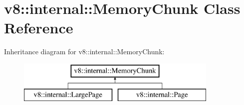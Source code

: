 \hypertarget{classv8_1_1internal_1_1_memory_chunk}{}\section{v8\+:\+:internal\+:\+:Memory\+Chunk Class Reference}
\label{classv8_1_1internal_1_1_memory_chunk}
Inheritance diagram for v8\+:\+:internal\+:\+:Memory\+Chunk\+:\begin{figure}[H]
\begin{center}
\leavevmode
\includegraphics[height=2.000000cm]{classv8_1_1internal_1_1_memory_chunk}
\end{center}
\end{figure}
